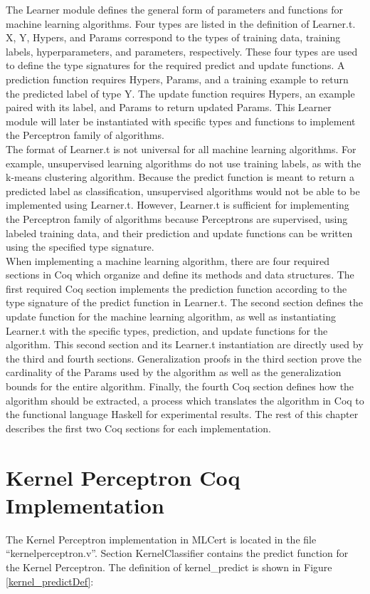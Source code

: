 The Learner module defines the general form of parameters and functions for machine learning algorithms. Four types are listed in the definition of Learner.t. X, Y, Hypers, and Params correspond to the types of training data, training labels, hyperparameters, and parameters, respectively. These four types are used to define the type signatures for the required predict and update functions. A prediction function requires Hypers, Params, and a training example to return the predicted label of type Y. The update function requires Hypers, an example paired with its label, and Params to return updated Params. This Learner module will later be instantiated with specific types and functions to implement the Perceptron family of algorithms. 
\\The format of Learner.t is not universal for all machine learning algorithms. For example, unsupervised learning algorithms do not use training labels, as with the k-means clustering algorithm. Because the predict function is meant to return a predicted label as classification, unsupervised algorithms would not be able to be implemented using Learner.t. However, Learner.t is sufficient for implementing the Perceptron family of algorithms because Perceptrons are supervised, using labeled training data, and their prediction and update functions can be written using the specified type signature.
\\When implementing a machine learning algorithm, there are four required sections in Coq which organize and define its methods and data structures. The first required Coq section implements the prediction function according to the type signature of the predict function in Learner.t. The second section defines the update function for the machine learning algorithm, as well as instantiating Learner.t with the specific types, prediction, and update functions for the algorithm. This second section and its Learner.t instantiation are directly used by the third and fourth sections. Generalization proofs in the third section prove the cardinality of the Params used by the algorithm as well as the generalization bounds for the entire algorithm. Finally, the fourth Coq section defines how the algorithm should be extracted, a process which translates the algorithm in Coq to the functional language Haskell for experimental results. The rest of this chapter describes the first two Coq sections for each implementation.
\section{Kernel Perceptron Coq Implementation}\label{KPCoqImp}
The Kernel Perceptron implementation in MLCert is located in the file ``kernelperceptron.v''. Section KernelClassifier contains the predict function for the Kernel Perceptron. The definition of kernel\_predict is shown in Figure \ref{kernel_predictDef}:

